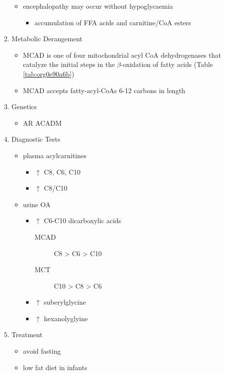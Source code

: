 \documentclass[12pt]{scrartcl}
\begin{document}
\begin{enumerate}
\begin{itemize}
\item encephalopathy may occur without hypoglycaemia
\begin{itemize}
\item accumulation of FFA acids and carnitine/CoA esters
\end{itemize}
\end{itemize}
\item Metabolic Derangement
\label{sec:org6742992}
\begin{itemize}
\item MCAD is one of four mitochondrial acyl CoA dehydrogenases that
catalyze the initial steps in the \(\beta\)-oxidation of fatty acids
(Table \ref{tab:org0e90a6b})
\item MCAD accepts fatty-acyl-CoAs 6-12 carbons in length
\end{itemize}

\item Genetics
\label{sec:orgaa7d546}
\begin{itemize}
\item AR ACADM
\end{itemize}
\item Diagnostic Tests
\label{sec:org2c3b666}
\begin{itemize}
\item plasma acylcarnitines
\begin{itemize}
\item \(\uparrow\) C8, C6, C10
\item \(\uparrow\) C8/C10
\end{itemize}
\item urine OA
\begin{itemize}
\item \(\uparrow\) C6-C10 dicarboxylic acids
\begin{description}
\item[{MCAD}] C8 > C6 > C10
\item[{MCT}] C10 > C8 > C6
\end{description}
\item \(\uparrow\) suberylglycine
\item \(\uparrow\) hexanolyglyine
\end{itemize}
\end{itemize}

\item Treatment
\label{sec:orgb44ff2f}
\begin{itemize}
\item avoid fasting
\item low fat diet in infants
\end{itemize}
\end{enumerate}
\end{document}
